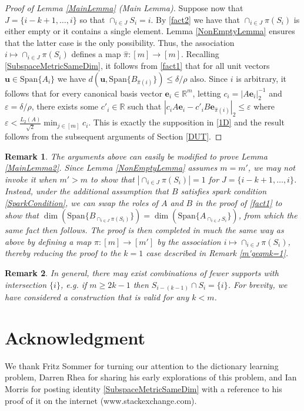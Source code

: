 \documentclass[journal, twocolumn]{IEEEtran}
\newtheorem{remark}{Remark}
\begin{document}
\begin{proof}[Proof of Lemma \ref{MainLemma} (Main Lemma)]
Suppose now that $J = \{i-k+1, \ldots, i\}$ so that $\cap_{i \in J} S_i = i$. By \eqref{fact2} we have that $\cap_{i \in J} \pi(S_i)$ is either empty or it contains a single element. Lemma \ref{NonEmptyLemma} ensures that the latter case is the only possibility. Thus, the association $i \mapsto \cap_{i \in J} \pi(S_i)$ defines a map $\hat \pi: [m] \to [m]$. Recalling \eqref{SubspaceMetricSameDim}, it follows from \eqref{fact1} that for all unit vectors $\mathbf{u} \in \text{Span}\{A_i\}$ we have $d\left( \mathbf{u}, \text{Span}\{B_{\hat \pi(i)}\}\right) \leq \delta/\rho$ also. Since $i$ is arbitrary, it follows that for every canonical basis vector $\mathbf{e}_i \in \mathbb{R}^m$, letting $c_i = |A\mathbf{e}_i|_2^{-1}$ and $\varepsilon = \delta/\rho$, there exists some $c'_i \in \mathbb{R}$ such that $|c_iA\mathbf{e}_i - c'_iB\mathbf{e}_{\hat \pi(i)}|_2 \leq \varepsilon$ where $\varepsilon < \frac{L_2(A)}{\sqrt{2}} \min_{j \in [m]} c_i$. This is exactly the supposition in \eqref{1D} and the result follows from the subsequent arguments of Section \ref{DUT}. 
\end{proof}

\begin{remark}
The arguments above can easily be modified to prove Lemma \ref{MainLemma2}. Since Lemma \ref{NonEmptyLemma} assumes $m = m'$, we may not invoke it when $m' > m$ to show that $|\cap_{i \in J} \pi(S_i)| = 1$ for $J = \{i-k+1, \ldots, i\}$. Instead, under the additional assumption that $B$ satisfies spark condition \eqref{SparkCondition}, we can swap the roles of $A$ and $B$ in the proof of \eqref{fact1} to show that $\dim(\text{Span}\{B_{\cap_{i \in J}\pi(S_i)}\}) = \dim(\text{Span}\{A_{\cap_{i \in J} S_i}\})$, from which the same fact then follows. The proof is then completed in much the same way as above by defining a map $\pi: [m] \to [m']$ by the association $i \mapsto \cap_{i \in J} \pi(S_i)$, thereby reducing the proof to the $k=1$ case described in Remark \ref{m'geqmk=1}.
\end{remark}

\begin{remark} In general, there may exist combinations of fewer supports with intersection $\{i\}$, e.g. if $m \geq 2k-1$ then $S_{i - (k-1)} \cap S_i = \{i\}$. For brevity, we have considered a construction that is valid for any $k < m$.
\end{remark}

\section*{Acknowledgment}
We thank Fritz Sommer for turning our attention to the dictionary learning problem, Darren Rhea for sharing his early explorations of this problem, and Ian Morris for posting identity \eqref{SubspaceMetricSameDim} with a reference to his proof of it on the internet (www.stackexchange.com). %
\end{document}
